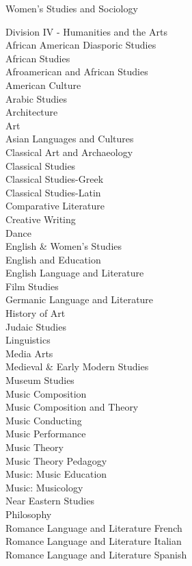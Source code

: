 \begin{enumsubsection}
\begin{enumsubsubsection}
\begin{description}
Women's Studies and Sociology\\
\item{Division IV - Humanities and the Arts}\\
African American Diasporic Studies\\
African Studies\\
Afroamerican and African Studies\\
American Culture\\
Arabic Studies\\
Architecture\\
Art\\
Asian Languages and Cultures\\
Classical Art and Archaeology \\
Classical Studies\\
Classical Studies-Greek\\
Classical Studies-Latin\\
Comparative Literature\\
Creative Writing\\
Dance\\
English \& Women's Studies\\
English and Education\\
English Language and Literature\\
Film Studies\\
Germanic Language and Literature\\
History of Art\\
Judaic Studies\\
Linguistics\\
Media Arts\\
Medieval \& Early Modern Studies\\
Museum Studies\\
Music Composition\\
Music Composition and Theory\\
Music Conducting\\
Music Performance\\
Music Theory\\
Music Theory Pedagogy\\
Music: Music Education\\
Music: Musicology\\
Near Eastern Studies\\
Philosophy\\
Romance Language and Literature French\\
Romance Language and Literature Italian\\
Romance Language and Literature Spanish\\

\end{description}
\end{enumsubsubsection}
\end{enumsubsection}
